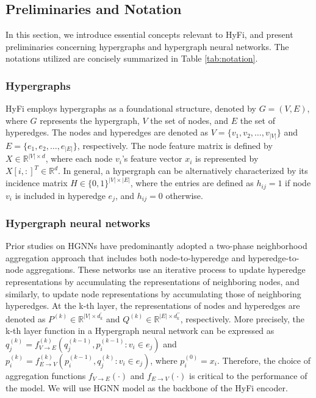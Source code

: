 \subsection{Preliminaries and Notation}
In this section, we introduce essential concepts relevant to HyFi, and present preliminaries concerning hypergraphs and hypergraph neural networks. The notations utilized are concisely summarized in Table \ref{tab:notation}.



\subsubsection{Hypergraphs}
HyFi employs hypergraphs as a foundational structure, denoted by \( G = (V, E) \), where \( G \) represents the hypergraph, \( V \) the set of nodes, and \( E \) the set of hyperedges.  The nodes and hyperedges are denoted as \( V = \{v_1, v_2, \ldots, v_{|V|}\} \) and \( E = \{e_1, e_2, \ldots, e_{|E|}\} \), respectively. The node feature matrix is defined by \( X \in \mathbb{R}^{|V| \times d} \), where each node \( v_i \)'s feature vector \( x_i \) is represented by \( X[i, :]^T \in \mathbb{R}^d \). In general, a hypergraph can be alternatively characterized by its incidence matrix \( H \in \{0, 1\}^{|V| \times |E|} \), where the entries are defined as \( h_{ij} = 1 \) if node \( v_i \) is included in hyperedge \( e_j \), and \( h_{ij} = 0 \) otherwise.


\subsubsection{Hypergraph neural networks}

Prior studies on HGNNs have predominantly adopted a two-phase neighborhood aggregation approach that includes both node-to-hyperedge and hyperedge-to-node aggregations. These networks use an iterative process to update hyperedge representations by accumulating the representations of neighboring nodes, and similarly, to update node representations by accumulating those of neighboring hyperedges. At the k-th layer, the representations of nodes and hyperedges are denoted as \( P^{(k)} \in \mathbb{R}^{|V| \times d^\prime_k} \) and \( Q^{(k)} \in \mathbb{R}^{|E| \times d^{\prime\prime}_k} \), respectively. More precisely, the k-th layer function in a Hypergraph neural network can be expressed as \( q_j^{(k)} = f_{V \rightarrow E}^{(k)}(q_{j}^{(k-1)}, p_{i}^{(k-1)} : v_i \in e_j) \) and \( p_i^{(k)} = f_{E \rightarrow V}^{(k)}(p_{i}^{(k-1)}, q_{j}^{(k)} : v_i \in e_j) \), where \( p_i^{(0)} = x_i \). Therefore, the choice of aggregation functions \( f_{V \rightarrow E}(\cdot) \) and \( f_{E \rightarrow V}(\cdot) \) is critical to the performance of the model. We will use HGNN model\cite{feng2019hypergraph} as the backbone of the HyFi encoder.

